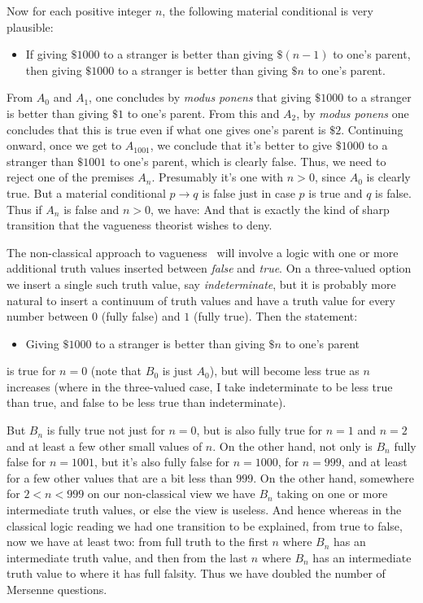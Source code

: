 Now for each positive integer $n$, the following material conditional is very plausible:
\begin{itemize}
\item[($A_n$)] If giving $ \$1000$ to a stranger is better than giving $ \$(n-1)$ to one's parent, then giving  $ \$1000$ to a stranger is 
    better than giving $ \$n$ to one's parent.
\end{itemize}

From $A_0$ and $A_1$, one concludes by \textit{modus ponens} that giving $ \$1000$ to a stranger is better than giving $ \$1$ to one's parent.
From this and $A_2$, by \textit{modus ponens} one concludes that this is true even if what one gives one's parent is $ \$2$. Continuing onward,
once we get to $A_{1001}$, we conclude that it's better to give $ \$1000$ to a stranger than $ \$1001$ to one's parent, which is clearly false. Thus,
we need to reject one of the premises $A_n$. Presumably it's one with $n>0$, since $A_0$ is clearly true. But a material conditional
$p\rightarrow q$ is false just in case $p$ is true and $q$ is false. Thus if $A_n$ is false and $n>0$, we have:
And that is exactly the kind of sharp transition that the vagueness theorist wishes to deny.

The non-classical approach to vagueness~\parencite[Chapter~4]{WilliamsonVagueness} will involve a logic with one or more additional truth values inserted
between \textit{false} and \textit{true}. On a three-valued option we insert a single such truth value, say 
\textit{indeterminate}, but it is probably more natural to insert a continuum of truth values and have a truth
value for every number between
$0$ (fully false) and $1$ (fully true).
 Then the statement:
\begin{itemize}
\item[($B_n$)] Giving $ \$1000$ to a stranger is better than giving $ \$n$ to one's parent 
\end{itemize}
is true for $n=0$ (note that $B_0$ is just $A_0$), but will become less true as $n$ increases (where in the
three-valued case, I take indeterminate to be less true than true, and false to be less true than indeterminate). 

But $B_n$ is fully true not just for $n=0$, but is also fully true for $n=1$ and $n=2$ and at least a few other small
values of $n$. On the other hand, not only is $B_n$ fully false for $n=1001$, but it's also fully false for
$n=1000$, for $n=999$, and at least for a few other values that are a bit less than $999$. On the other hand, somewhere 
for $2<n<999$ on our non-classical view we have $B_n$ taking on one or more intermediate truth values, or else the
view is useless. And hence whereas in the classical logic reading we had one transition to be explained, from true to false, now we have at least two: from full truth to the first $n$ where $B_n$ has an intermediate truth value, and
then from the last $n$ where $B_n$ has an intermediate truth value to where it has full falsity.
Thus we have doubled 
the number of Mersenne questions. 

